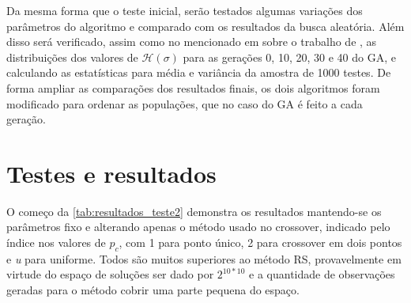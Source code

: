 Da mesma forma que o teste inicial, serão testados algumas variações dos parâmetros do algoritmo e comparado com os resultados da busca aleatória. Além disso será verificado, assim como no mencionado em  sobre o trabalho de , as distribuições dos valores de \(\mathcal{H}(\sigma)\) para as gerações 0, 10, 20, 30 e 40 do GA, e calculando as estatísticas para média e variância da amostra de 1000 testes. De forma ampliar as comparações dos resultados finais, os dois algoritmos foram modificado para ordenar as populações, que no caso do GA é feito a cada geração.

\section{Testes e resultados}
O começo da \autoref{tab:resultados_teste2} demonstra os resultados mantendo-se os parâmetros fixo e alterando apenas o método usado no crossover, indicado pelo índice nos valores de \(p_c\), com 1 para ponto único, 2 para crossover em dois pontos e \textit{u} para uniforme. Todos são muitos superiores ao método RS, provavelmente em virtude do espaço de soluções ser dado por \(2^{10*10}\) e a quantidade de observações geradas para o método cobrir uma parte pequena do espaço. 

